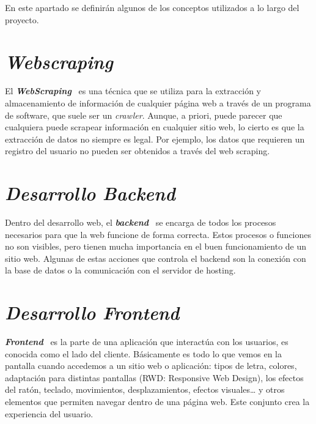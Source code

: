 
En este apartado se definirán algunos de los conceptos utilizados a lo largo del proyecto.

\section{\textit{Webscraping}}
El \textbf{\textit{WebScraping}}~\cite{webScrap} es una técnica que se utiliza para la extracción y almacenamiento de información de cualquier página web a través de un programa de software, que suele ser un \textit{crawler}. Aunque, a priori, puede parecer que cualquiera puede scrapear información en cualquier sitio web, lo cierto es que la extracción de datos no siempre es legal. Por ejemplo, los datos que requieren un registro del usuario no pueden ser obtenidos a través del web scraping.

\section{\textit{Desarrollo Backend}}
Dentro del desarrollo web, el \textbf{\textit{backend}}~\cite{backend} se encarga de todos los procesos necesarios para que la web funcione de forma correcta. Estos procesos o funciones no son visibles, pero tienen mucha importancia en el buen funcionamiento de un sitio web. Algunas de estas acciones que controla el backend son la conexión con la base de datos o la comunicación con el servidor de hosting.

\section{\textit{Desarrollo Frontend}}
\textbf{\textit{Frontend}}~\cite{Frontend} es la parte de una aplicación que interactúa con los usuarios, es conocida como el lado del cliente. Básicamente es todo lo que vemos en la pantalla cuando accedemos a un sitio web o aplicación: tipos de letra, colores, adaptación para distintas pantallas (RWD: Responsive Web Design), los efectos del ratón, teclado, movimientos, desplazamientos, efectos visuales… y otros elementos que permiten navegar dentro de una página web. Este conjunto crea la experiencia del usuario.

